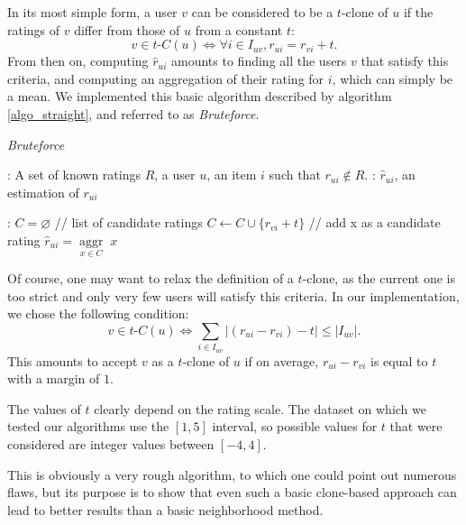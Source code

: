 \documentclass[conference]{IEEEtran}
\newcommand{\predr}[1]{\hat{r}_{#1}}
\newcommand{\aggr}[1]{\underset{#1}{\operatorname{aggr}}\;}
\begin{document}
In its most simple form, a user $v$ can be considered to be a $t$-clone of $u$ if
the ratings of $v$ differ from those of $u$ from a constant $t$:
\begin{equation}
v \in t\text{-}C(u) \iff \forall i \in I_{uv}, r_{ui} = r_{vi} + t.
\end{equation}
From then on, computing $\predr{ui}$ amounts to finding all the users $v$ that
satisfy this criteria, and computing an aggregation of their rating for $i$,
which can simply be a mean. We implemented this basic algorithm described by
algorithm \ref{algo_straight}, and referred to as \textit{Bruteforce}.

 \begin{algorithm}[!ht]
   \caption{\textit{Bruteforce}}
       \label{algo_straight}
       \begin{algorithmic}

      : A set of known ratings $R$, a user $u$, an item
      $i$ such that $r_{ui} \notin R$.
      : $\hat{r}_{ui}$, an estimation of $r_{ui}$

      :
      \STATE $C = \varnothing$ \quad \quad // list of candidate ratings
          \STATE $C \gets C \cup \{r_{vi} + t\}$ \quad // add x as a candidate rating
          \ENDIF
        \ENDFOR
	    \ENDFOR
    \STATE $\hat{r}_{ui} = \aggr{x \in C} x$
\end{algorithmic}
\end{algorithm}

Of course, one may want to relax the definition of a $t$-clone, as the current
one is too strict and only very few users will satisfy this criteria. In our
implementation, we chose the following condition:
$$v \in t\text{-}C(u) \iff \sum_{i \in I_{uv}} |(r_{ui} - r_{vi}) - t| \leq |I_{uv}|.$$
This amounts to accept $v$ as a $t$-clone of $u$ if on average, $r_{ui} -
r_{vi}$ is equal to $t$ with a margin of $1$.

The values of $t$ clearly depend on the rating scale. The dataset on which we
tested our algorithms use the $[1, 5]$ interval, so possible values for $t$
that were considered are integer values between $[-4, 4]$.

This is obviously a very rough algorithm, to which one could point out numerous
flaws, but its purpose is to show that even such a basic clone-based approach
can lead to better results than a basic neighborhood method.
\end{document}
